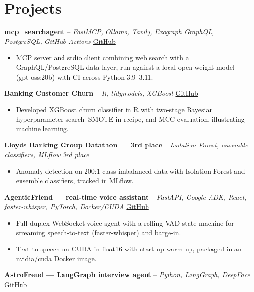 \documentclass[a4paper,11pt]{article}
\begin{document}
\section{Projects}
\noindent\textbf{mcp\_searchagent} -- \textit{FastMCP, Ollama, Tavily, Exograph GraphQL, PostgreSQL, GitHub Actions} \hfill \href{https://github.com/Thiruvel-AP/mcp_searchagent}{GitHub}
\begin{itemize}
  \item MCP server and stdio client combining web search with a GraphQL/PostgreSQL data layer, run against a local open-weight model (gpt-oss:20b) with CI across Python 3.9–3.11.
\end{itemize}
\vspace{3pt}
\noindent\textbf{Banking Customer Churn} -- \textit{R, tidymodels, XGBoost} \hfill \href{https://github.com/Thiruvel-AP/Banking-Customer-Churn-Prediction}{GitHub}
\begin{itemize}
  \item Developed XGBoost churn classifier in R with two-stage Bayesian hyperparameter search, SMOTE in recipe, and MCC evaluation, illustrating machine learning.
\end{itemize}
\vspace{3pt}
\noindent\textbf{Lloyd\textquotesingle{}s Banking Group Datathon — 3rd place} -- \textit{Isolation Forest, ensemble classifiers, MLflow} \hfill \textit{3rd place}
\begin{itemize}
  \item Anomaly detection on 200:1 class-imbalanced data with Isolation Forest and ensemble classifiers, tracked in MLflow.
\end{itemize}
\vspace{3pt}
\noindent\textbf{AgenticFriend — real-time voice assistant} -- \textit{FastAPI, Google ADK, React, faster-whisper, PyTorch, Docker/CUDA} \hfill \href{https://github.com/Thiruvel-AP/adk_multi-agent}{GitHub}
\begin{itemize}
  \item Full-duplex WebSocket voice agent with a rolling VAD state machine for streaming speech-to-text (faster-whisper) and barge-in.
  \item Text-to-speech on CUDA in float16 with start-up warm-up, packaged in an nvidia/cuda Docker image.
\end{itemize}
\vspace{3pt}
\noindent\textbf{AstroFreud — LangGraph interview agent} -- \textit{Python, LangGraph, DeepFace} \hfill \href{https://github.com/Thiruvel-AP/AstroFreud}{GitHub}
\end{document}
